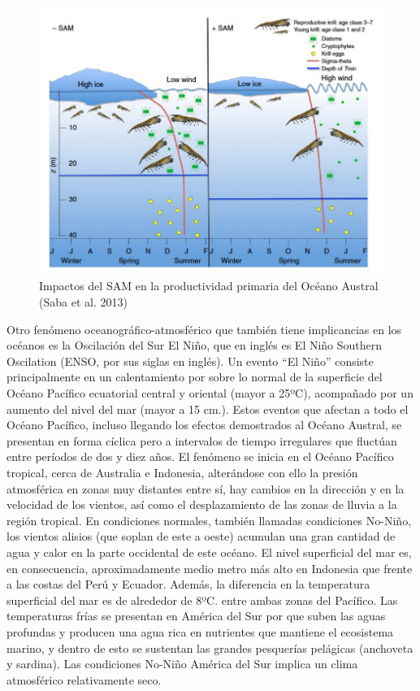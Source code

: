 \documentclass[
]{article}
\begin{document}
\begin{figure}

{\centering \includegraphics[width=0.7\linewidth]{images/Krill} 

}

\caption{Impactos del SAM en la productividad primaria del Océano Austral (Saba et al. 2013)}\label{fig:unnamed-chunk-4}
\end{figure}

Otro fenómeno oceanográfico-atmosférico que también tiene implicancias
en los océanos es la Oscilación del Sur El Niño, que en inglés es El
Niño Southern Oscilation (ENSO, por sus siglas en inglés). Un evento
``El Niño'' consiste principalmente en un calentamiento por sobre lo
normal de la superficie del Océano Pacífico ecuatorial central y
oriental (mayor a 25ºC), acompañado por un aumento del nivel del mar
(mayor a 15 cm.). Estos eventos que afectan a todo el Océano Pacífico,
incluso llegando los efectos demostrados al Océano Austral, se presentan
en forma cíclica pero a intervalos de tiempo irregulares que fluctúan
entre períodos de dos y diez años. El fenómeno se inicia en el Océano
Pacífico tropical, cerca de Australia e Indonesia, alterándose con ello
la presión atmosférica en zonas muy distantes entre sí, hay cambios en
la dirección y en la velocidad de los vientos, así como el
desplazamiento de las zonas de lluvia a la región tropical. En
condiciones normales, también llamadas condiciones No-Niño, los vientos
alisios (que soplan de este a oeste) acumulan una gran cantidad de agua
y calor en la parte occidental de este océano. El nivel superficial del
mar es, en consecuencia, aproximadamente medio metro más alto en
Indonesia que frente a las costas del Perú y Ecuador. Además, la
diferencia en la temperatura superficial del mar es de alrededor de 8ºC.
entre ambas zonas del Pacífico. Las temperaturas frías se presentan en
América del Sur por que suben las aguas profundas y producen una agua
rica en nutrientes que mantiene el ecosistema marino, y dentro de esto
se sustentan las grandes pesquerías pelágicas (anchoveta y sardina). Las
condiciones No-Niño América del Sur implica un clima atmosférico
relativamente seco.
\end{document}
